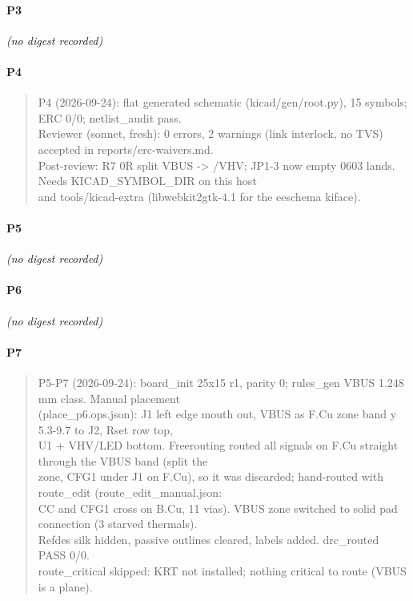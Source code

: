 \documentclass[11pt,a4paper]{article}
\begin{document}
\paragraph*{P3}
\emph{(no digest recorded)}
\paragraph*{P4}
\begin{quote}\small\ttfamily\raggedright
P4 (2026-09-24): flat generated schematic (kicad/gen/root.py), 15 symbols; ERC 0/0; netlist\_audit pass.\\
Reviewer (sonnet, fresh): 0 errors, 2 warnings (link interlock, no TVS) accepted in reports/erc-waivers.md.\\
Post-review: R7 0R split VBUS -\textgreater{} /VHV; JP1-3 now empty 0603 lands. Needs KICAD\_SYMBOL\_DIR on this host\\
and tools/kicad-extra (libwebkit2gtk-4.1 for the eeschema kiface).
\end{quote}
\paragraph*{P5}
\emph{(no digest recorded)}
\paragraph*{P6}
\emph{(no digest recorded)}
\paragraph*{P7}
\begin{quote}\small\ttfamily\raggedright
P5-P7 (2026-09-24): board\_init 25x15 r1, parity 0; rules\_gen VBUS 1.248 mm class. Manual placement\\
(place\_p6.ops.json): J1 left edge mouth out, VBUS as F.Cu zone band y 5.3-9.7 to J2, Rset row top,\\
U1 + VHV/LED bottom. Freerouting routed all signals on F.Cu straight through the VBUS band (split the\\
zone, CFG1 under J1 on F.Cu), so it was discarded; hand-routed with route\_edit (route\_edit\_manual.json:\\
CC and CFG1 cross on B.Cu, 11 vias). VBUS zone switched to solid pad connection (3 starved thermals).\\
Refdes silk hidden, passive outlines cleared, labels added. drc\_routed PASS 0/0.\\
route\_critical skipped: KRT not installed; nothing critical to route (VBUS is a plane).
\end{quote}
\end{document}
